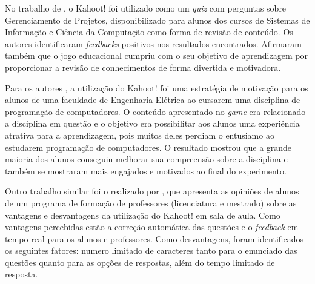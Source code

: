 \documentclass[
	12pt,				%
	openright,			%
	oneside,
	a4paper,			%
	english,			%
	french,				%
	spanish,			%
	brazil,				%
	]{abntex2}
\begin{document}

 
 No trabalho de , o Kahoot! foi utilizado como um \textit{quiz} com perguntas sobre Gerenciamento de Projetos, disponibilizado para alunos dos cursos de Sistemas de
Informação e Ciência da Computação como forma de revisão de conteúdo. Os autores identificaram \textit{feedbacks} positivos nos resultados encontrados. Afirmaram também que o jogo educacional cumpriu com o seu objetivo de aprendizagem por proporcionar a revisão de conhecimentos de forma divertida e motivadora.

Para os autores , a utilização do Kahoot! foi uma estratégia de motivação para os alunos de uma faculdade de Engenharia Elétrica ao cursarem uma disciplina de programação de computadores. O conteúdo apresentado no \textit{game} era relacionado a disciplina em questão e o objetivo era possibilitar aos alunos uma experiência atrativa para a aprendizagem, pois muitos deles perdiam o entusiamo ao estudarem programação de computadores. O resultado mostrou que a grande maioria dos alunos conseguiu melhorar sua  compreensão sobre a disciplina e também se mostraram mais engajados e motivados ao final do experimento.

Outro trabalho similar foi o realizado por , que apresenta as opiniões de alunos de um programa de formação de professores (licenciatura e mestrado) sobre as vantagens e desvantagens da utilização do Kahoot! em sala de aula. Como vantagens percebidas estão a correção automática das questões e o \textit{feedback} em tempo real para os alunos e professores. Como desvantagens, foram identificados os seguintes fatores: numero limitado de caracteres tanto para o enunciado das questões quanto para as opções de respostas, além do tempo limitado de resposta.
\end{document}
